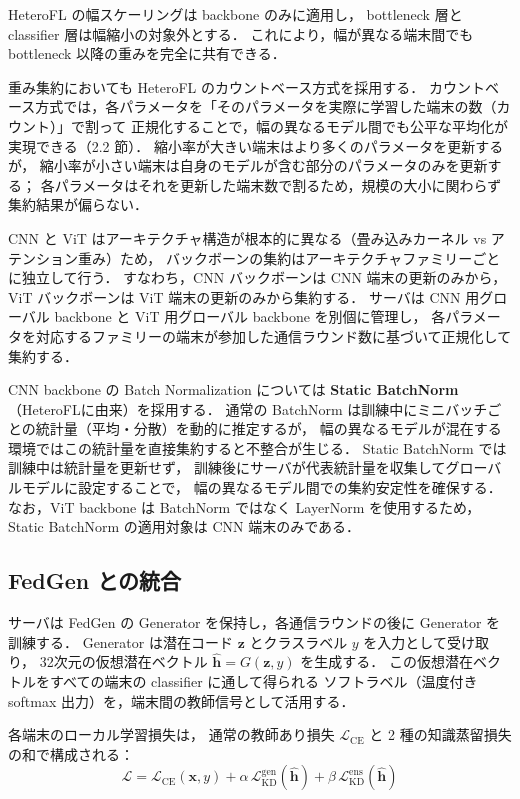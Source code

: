 \documentclass[Japanese,noauthor]{dicomopapers}
\begin{document}
HeteroFL の幅スケーリングは backbone のみに適用し，
bottleneck 層と classifier 層は幅縮小の対象外とする．
これにより，幅が異なる端末間でも bottleneck 以降の重みを完全に共有できる．

重み集約においても HeteroFL のカウントベース方式を採用する．
カウントベース方式では，各パラメータを「そのパラメータを実際に学習した端末の数（カウント）」で割って
正規化することで，幅の異なるモデル間でも公平な平均化が実現できる（2.2 節）．
縮小率が大きい端末はより多くのパラメータを更新するが，
縮小率が小さい端末は自身のモデルが含む部分のパラメータのみを更新する；
各パラメータはそれを更新した端末数で割るため，規模の大小に関わらず集約結果が偏らない．

CNN と ViT はアーキテクチャ構造が根本的に異なる（畳み込みカーネル vs アテンション重み）ため，
バックボーンの集約はアーキテクチャファミリーごとに独立して行う．
すなわち，CNN バックボーンは CNN 端末の更新のみから，ViT バックボーンは ViT 端末の更新のみから集約する．
サーバは CNN 用グローバル backbone と ViT 用グローバル backbone を別個に管理し，
各パラメータを対応するファミリーの端末が参加した通信ラウンド数に基づいて正規化して集約する．

CNN backbone の Batch Normalization については \textbf{Static BatchNorm}（HeteroFL\cite{HeteroFL}に由来）を採用する．
通常の BatchNorm は訓練中にミニバッチごとの統計量（平均・分散）を動的に推定するが，
幅の異なるモデルが混在する環境ではこの統計量を直接集約すると不整合が生じる．
Static BatchNorm では訓練中は統計量を更新せず，
訓練後にサーバが代表統計量を収集してグローバルモデルに設定することで，
幅の異なるモデル間での集約安定性を確保する．
なお，ViT backbone は BatchNorm ではなく LayerNorm を使用するため，
Static BatchNorm の適用対象は CNN 端末のみである．

\subsection{FedGen との統合}

サーバは FedGen の Generator を保持し，各通信ラウンドの後に Generator を訓練する．
Generator は潜在コード $\mathbf{z}$ とクラスラベル $y$ を入力として受け取り，
32次元の仮想潜在ベクトル $\hat{\mathbf{h}} = G(\mathbf{z}, y)$ を生成する．
この仮想潜在ベクトルをすべての端末の classifier に通して得られる
ソフトラベル（温度付き softmax 出力）を，端末間の教師信号として活用する．

各端末のローカル学習損失は，
通常の教師あり損失 $\mathcal{L}_{\mathrm{CE}}$ と 2 種の知識蒸留損失の和で構成される：
\begin{equation}
  \mathcal{L} = \mathcal{L}_{\mathrm{CE}}(\mathbf{x}, y)
              + \alpha \, \mathcal{L}_{\mathrm{KD}}^{\mathrm{gen}}(\hat{\mathbf{h}})
              + \beta  \, \mathcal{L}_{\mathrm{KD}}^{\mathrm{ens}}(\hat{\mathbf{h}})
  \label{eq:loss}
\end{equation}
\end{document}
